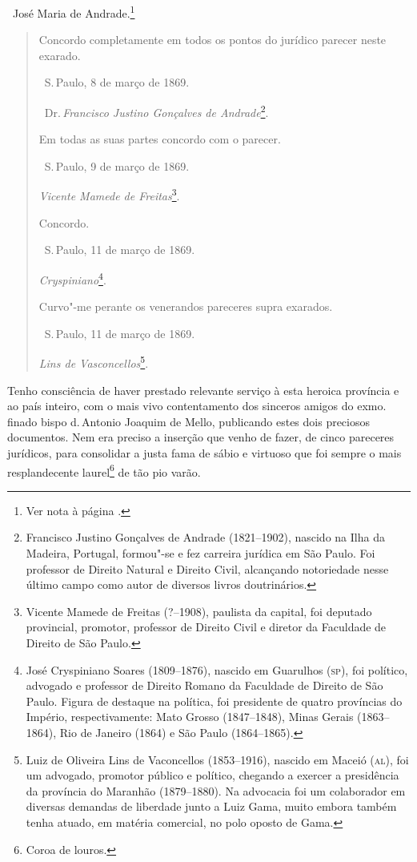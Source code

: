 \hfill\ José Maria de Andrade.\footnote{Ver nota à página \pageref{maria}.}

\begin{quote}
Concordo completamente em todos os pontos do jurídico parecer neste exarado.

\qquad\ S.\,Paulo, 8 de março de 1869.

\qquad\ Dr.\,\emph{Francisco Justino Gonçalves de Andrade}\footnote{Francisco \label{justino}
  Justino Gonçalves de Andrade (1821--1902), nascido na Ilha da Madeira,
  Portugal, formou"-se e fez carreira jurídica em São Paulo. Foi
  professor de Direito Natural e Direito Civil, alcançando notoriedade
  nesse último campo como autor de diversos livros doutrinários.}.\bigskip

Em todas as suas partes concordo com o parecer.

\qquad\ S.\,Paulo, 9 de março de 1869.

\qquad\emph{Vicente Mamede de Freitas}\footnote{Vicente Mamede de Freitas
  (?--1908), paulista da capital, foi deputado provincial, promotor,
  professor de Direito Civil e diretor da Faculdade de Direito de São
  Paulo.}.\bigskip

Concordo.

\qquad\ S.\,Paulo, 11 de março de 1869.

\qquad\emph{Cryspiniano}\footnote{José Cryspiniano Soares (1809--1876),
  nascido em Guarulhos (\textsc{sp}), foi político, advogado e professor de
  Direito Romano da Faculdade de Direito de São Paulo. Figura de
  destaque na política, foi presidente de quatro províncias do Império,
  respectivamente: Mato Grosso (1847--1848), Minas Gerais (1863--1864),
  Rio de Janeiro (1864) e São Paulo (1864--1865).}.\bigskip

Curvo"-me perante os venerandos pareceres supra exarados.

\qquad\ S.\,Paulo, 11 de março de 1869.

\qquad\emph{Lins de Vasconcellos}\footnote{Luiz de Oliveira Lins de
  Vaconcellos (1853--1916), nascido em Maceió (\textsc{al}), foi um advogado,
  promotor público e político, chegando a exercer a presidência da
  província do Maranhão (1879--1880). Na advocacia foi um colaborador em
  diversas demandas de liberdade junto a Luiz Gama, muito embora também
  tenha atuado, em matéria comercial, no polo oposto de Gama.}.
  \end{quote}

Tenho consciência de haver prestado relevante serviço à esta heroica
província e ao país inteiro, com o mais vivo contentamento dos sinceros
amigos do exmo.\,finado bispo d.\,Antonio Joaquim de Mello, publicando
estes dois preciosos documentos. Nem era preciso a inserção que venho de
fazer, de cinco pareceres jurídicos, para consolidar a justa fama de
sábio e virtuoso que foi sempre o mais resplandecente laurel\footnote{
  Coroa de louros.} de tão pio varão.

